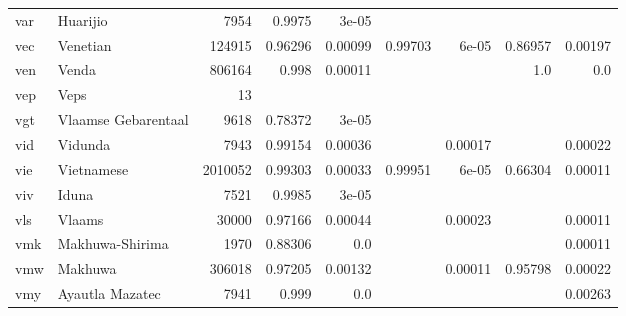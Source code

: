 \documentclass[11pt]{article}
\begin{document}
\begin{table*}[h]
{\begin{tabular}{llrrrrrrr}
var         & Huarijio         & 7954         & 0.9975         & 3e-05         &          &          &          &          \\

vec         & Venetian         & 124915         & 0.96296         & 0.00099         & 0.99703         & 6e-05         & 0.86957         & 0.00197         \\

ven         & Venda         & 806164         & 0.998         & 0.00011         &          &          & 1.0         & 0.0         \\

vep         & Veps         & 13         &          &          &          &          &          &          \\

vgt         & Vlaamse Gebarentaal         & 9618         & 0.78372         & 3e-05         &          &          &          &          \\

vid         & Vidunda         & 7943         & 0.99154         & 0.00036         &          & 0.00017         &          & 0.00022         \\

vie         & Vietnamese         & 2010052         & 0.99303         & 0.00033         & 0.99951         & 6e-05         & 0.66304         & 0.00011         \\

viv         & Iduna         & 7521         & 0.9985         & 3e-05         &          &          &          &          \\

vls         & Vlaams         & 30000         & 0.97166         & 0.00044         &          & 0.00023         &          & 0.00011         \\

vmk         & Makhuwa-Shirima         & 1970         & 0.88306         & 0.0         &          &          &          & 0.00011         \\

vmw         & Makhuwa         & 306018         & 0.97205         & 0.00132         &          & 0.00011         & 0.95798         & 0.00022         \\

vmy         & Ayautla Mazatec         & 7941         & 0.999         & 0.0         &          &          &          & 0.00263         \\


\end{tabular}}
\end{table*}
\end{document}
